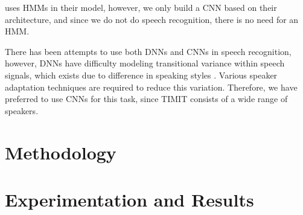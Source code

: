 \documentclass[a4paper,12pt]{article}
\begin{document}
\cite{sainath2013deep} uses HMMs in their model, however, we only build a CNN based on their architecture, and since we do not do speech recognition, there is no need for an HMM.

There has been attempts to use both DNNs and CNNs in speech recognition, however, DNNs have difficulty modeling transitional variance within speech signals, which exists due to difference in speaking styles \cite{lecun1995convolutional}. Various speaker adaptation techniques are required to reduce this variation. Therefore, we have preferred to use CNNs for this task, since TIMIT consists of a wide range of speakers.

\section{Methodology}

\section{Experimentation and Results}




\end{document}
